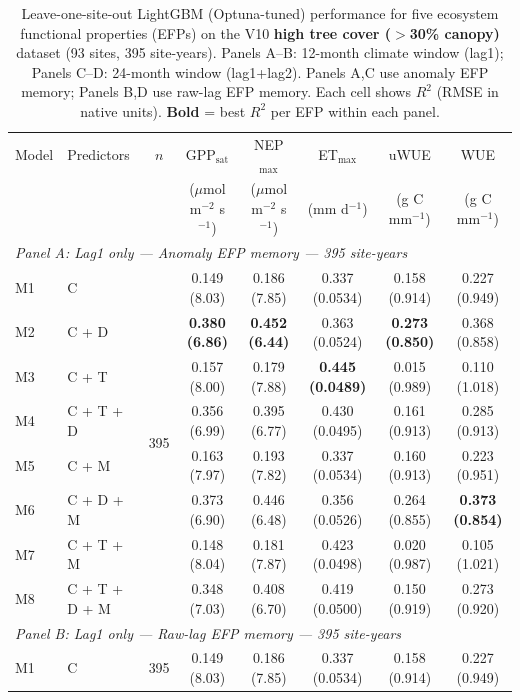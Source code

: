 \begin{table}[htbp]
\centering
\caption{Leave-one-site-out LightGBM (Optuna-tuned) performance for five ecosystem functional properties (EFPs) on the V10 \textbf{high tree cover ($>$30\% canopy)} dataset (93 sites, 395 site-years). Panels A--B: 12-month climate window (lag1); Panels C--D: 24-month window (lag1+lag2). Panels A,C use anomaly EFP memory; Panels B,D use raw-lag EFP memory. Each cell shows $R^2$ (RMSE in native units). \textbf{Bold} = best $R^2$ per EFP within each panel.}
\label{tab:LGBoptuna_LOSO_v10_filtered}
\footnotesize
\setlength{\tabcolsep}{4pt}
\begin{tabular}{llcccccc}
\toprule
Model & Predictors & $n$ & GPP$_\mathrm{sat}$ & NEP$_\mathrm{max}$ & ET$_\mathrm{max}$ & uWUE & WUE \\
  &  &  & ($\mu$mol m$^{-2}$ s$^{-1}$) & ($\mu$mol m$^{-2}$ s$^{-1}$) & (mm d$^{-1}$) & (g C mm$^{-1}$) & (g C mm$^{-1}$) \\
\midrule
\multicolumn{8}{l}{\textit{Panel A: Lag1 only --- Anomaly EFP memory --- 395 site-years}} \\
\midrule
M1 & C & \multirow{8}{*}{395} & 0.149 (8.03) & 0.186 (7.85) & 0.337 (0.0534) & 0.158 (0.914) & 0.227 (0.949) \\
M2 & C + D &  & \textbf{0.380 (6.86)} & \textbf{0.452 (6.44)} & 0.363 (0.0524) & \textbf{0.273 (0.850)} & 0.368 (0.858) \\
M3 & C + T &  & 0.157 (8.00) & 0.179 (7.88) & \textbf{0.445 (0.0489)} & 0.015 (0.989) & 0.110 (1.018) \\
M4 & C + T + D &  & 0.356 (6.99) & 0.395 (6.77) & 0.430 (0.0495) & 0.161 (0.913) & 0.285 (0.913) \\
M5 & C + M &  & 0.163 (7.97) & 0.193 (7.82) & 0.337 (0.0534) & 0.160 (0.913) & 0.223 (0.951) \\
M6 & C + D + M &  & 0.373 (6.90) & 0.446 (6.48) & 0.356 (0.0526) & 0.264 (0.855) & \textbf{0.373 (0.854)} \\
M7 & C + T + M &  & 0.148 (8.04) & 0.181 (7.87) & 0.423 (0.0498) & 0.020 (0.987) & 0.105 (1.021) \\
M8 & C + T + D + M &  & 0.348 (7.03) & 0.408 (6.70) & 0.419 (0.0500) & 0.150 (0.919) & 0.273 (0.920) \\
\midrule
\multicolumn{8}{l}{\textit{Panel B: Lag1 only --- Raw-lag EFP memory --- 395 site-years}} \\
\midrule
M1 & C & \multirow{8}{*}{395} & 0.149 (8.03) & 0.186 (7.85) & 0.337 (0.0534) & 0.158 (0.914) & 0.227 (0.949) \\

\end{tabular}
\end{table}
